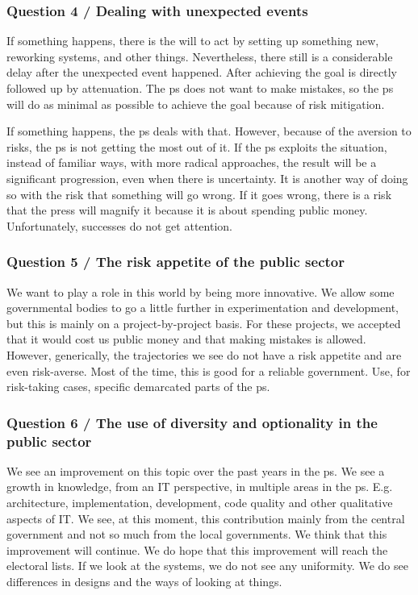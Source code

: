 \subsubsection{Question 4 / Dealing with unexpected events}
If something happens, there is the will to act by setting up something new, reworking systems, and other things. Nevertheless, there still is a considerable delay after the unexpected event happened. After achieving the goal is directly followed up by attenuation. The \gls{ps} does not want to make mistakes, so the \gls{ps} will do as minimal as possible to achieve the goal because of risk mitigation.

If something happens, the \gls{ps} deals with that. However, because of the aversion to risks, the \gls{ps} is not getting the most out of it. If the \gls{ps} exploits the situation, instead of familiar ways, with more radical approaches, the result will be a significant progression, even when there is uncertainty. It is another way of doing so with the risk that something will go wrong. If it goes wrong, there is a risk that the press will magnify it because it is about spending public money. Unfortunately, successes do not get attention.
\subsubsection{Question 5 / The risk appetite of the public sector}
We want to play a role in this world by being more innovative. We allow some governmental bodies to go a little further in experimentation and development, but this is mainly on a project-by-project basis. For these projects, we accepted that it would cost us public money and that making mistakes is allowed. However, generically, the trajectories we see do not have a risk appetite and are even risk-averse. Most of the time, this is good for a reliable government. Use, for risk-taking cases, specific demarcated parts of the \gls{ps}.
\subsubsection{Question 6 / The use of diversity and optionality in the public sector}
We see an improvement on this topic over the past years in the \gls{ps}. We see a growth in knowledge, from an IT perspective, in multiple areas in the \gls{ps}. E.g. architecture, implementation, development, code quality and other qualitative aspects of IT. We see, at this moment, this contribution mainly from the central government and not so much from the local governments. We think that this improvement will continue. We do hope that this improvement will reach the electoral lists. If we look at the systems, we do not see any uniformity. We do see differences in designs and the ways of looking at things.
